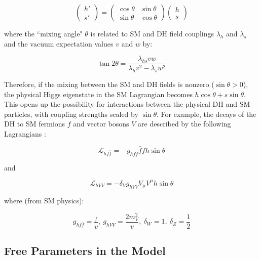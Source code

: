 \begin{equation}
\label{eq:higgs_mass_eigenstates}
\begin{pmatrix}
h' \\ s'
\end{pmatrix} = 
\begin{pmatrix}
\cos\theta & \sin\theta \\
\sin\theta & \cos\theta 
\end{pmatrix}
\begin{pmatrix}
h \\ s
\end{pmatrix}
\end{equation}

\noindent where the ``mixing angle" \(\theta\) is related to SM and DH field couplings \(\lambda_h\) and \(\lambda_s\) and the vacuum expectation values \(v\) and \(w\) by:

\begin{equation}
\label{eq:higgs_mixing_angle}
\tan2\theta = \frac{\lambda_{hs}vw}{\lambda_hv^2 - \lambda_sw^2}
\end{equation}

Therefore, if the mixing between the SM and DH fields is nonzero (\(\sin\theta > 0\)), the physical Higgs eigenstate in the SM Lagrangian becomes \(h\cos\theta + s\sin\theta\). This opens up the possibility for interactions between the physical DH and SM particles, with coupling strengths scaled by \(\sin\theta\). For example, the decays of the DH to SM fermions \(f\) and vector bosons \(V\) are described by the following Lagrangians \cite{Duerr_2016, pdg_2020}:  

\begin{equation}
\mathcal{L}_{hf\bar{f}} = -g_{hf\bar{f}}\bar{f}f h\sin\theta 
\end{equation}

\noindent and

\begin{equation}
\mathcal{L}_{hVV} = -\delta_V g_{hVV}V_\mu V^\mu h\sin\theta 
\end{equation}

\noindent where (from SM physics):

\begin{equation}
g_{hf\bar{f}} = \frac{_f}{v}, ~ g_{hVV} = \frac{2m_V^2}{v}, ~ \delta_W = 1, ~ \delta_Z = \frac{1}{2}
\end{equation}

\subsection{Free Parameters in the Model}
\label{sec:dh_model_free_parameters}

